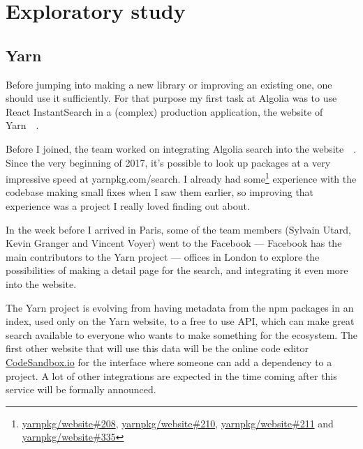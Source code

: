 
\chapter{Exploratory study} %
\label{chp:exploratory_study}
\section{Yarn} %
\label{sec:yarn}

Before jumping into making a new library or improving an existing one, one should use it sufficiently. For that purpose my first task at Algolia was to use React InstantSearch in a (complex) production application, the website of Yarn~\cite{yarn-site}~.


Before I joined, the team worked on integrating Algolia search into the website~\cite{yarn-pr-add-algolia}~. Since the very beginning of 2017, it's possible to look up packages at a very impressive speed at yarnpkg.com/search. I already had some\footnote{\href{https://github.com/yarnpkg/website/pulls/208}{yarnpkg/website\#208}, \href{https://github.com/yarnpkg/website/pulls/210}{yarnpkg/website\#210}, \href{https://github.com/yarnpkg/website/pulls211}{yarnpkg/website\#211} and \href{https://github.com/yarnpkg/website/pulls/335}{yarnpkg/website\#335}} experience with the codebase making small fixes when I saw them earlier, so improving that experience was a project I really loved finding out about.


In the week before I arrived in Paris, some of the team members (Sylvain Utard, Kevin Granger and Vincent Voyer) went to the Facebook --- Facebook has the main contributors to the Yarn project --- offices in London to explore the possibilities of making a detail page for the search, and integrating it even more into the website.

The Yarn project is evolving from having metadata from the npm packages in an index, used only on the Yarn website, to a free to use API, which can make great search available to everyone who wants to make something for the ecosystem. The first other website that will use this data will be the online code editor \href{https://codesandbox.io}{CodeSandbox.io} for the interface where someone can add a dependency to a project. A lot of other integrations are expected in the time coming after this service will be formally announced.

